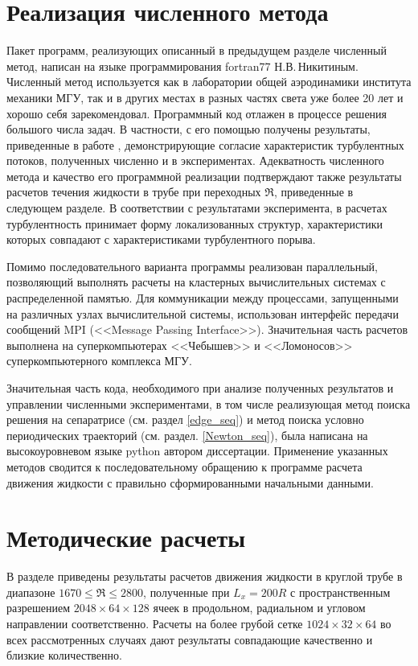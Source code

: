 \section{Реализация численного метода}

Пакет программ, реализующих описанный в предыдущем разделе численный метод, написан на языке программирования fortran77 Н.В.\,Никитиным. Численный метод используется как в лаборатории общей аэродинамики института механики МГУ, так и в других местах в разных частях света уже более 20 лет и хорошо себя зарекомендовал. Программный код отлажен в процессе решения большого числа задач. В частности, с его помощью получены результаты, приведенные в работе \cite{Nikitin2006}, демонстрирующие согласие характеристик турбулентных потоков, полученных численно и в экспериментах. Адекватность численного метода и качество его программной реализации подтверждают также результаты расчетов течения жидкости в трубе при переходных $\Re$, приведенные в следующем разделе. В соответствии с результатами эксперимента, в расчетах турбулентность принимает форму локализованных структур, характеристики которых совпадают с характеристиками турбулентного порыва.

Помимо последовательного варианта программы реализован параллельный, позволяющий выполнять расчеты на кластерных вычислительных системах с распределенной памятью. Для коммуникации между процессами, запущенными на различных узлах вычислительной системы, использован интерфейс передачи сообщений MPI (<<Message Passing Interface>>). Значительная часть расчетов выполнена на суперкомпьютерах <<Чебышев>> и <<Ломоносов>> суперкомпьютерного комплекса МГУ. 

Значительная часть кода, необходимого при анализе полученных результатов и управлении численными экспериментами, в том числе реализующая метод поиска решения на сепаратрисе (см. раздел \ref{edge_seq}) и метод поиска условно периодических траекторий (см. раздел. \ref{Newton_seq}), была написана на высокоуровневом языке python автором диссертации. Применение указанных методов сводится к последовательному обращению к программе расчета движения жидкости с правильно сформированными начальными данными. 


\section{Методические расчеты} \label{puff_calc}

В разделе приведены результаты расчетов движения жидкости в круглой трубе в диапазоне $1670 \leqslant \Re \leqslant 2800$, полученные при $L_x=200R$ с пространственным разрешением $2048 \times 64 \times 128$ ячеек в продольном, радиальном и угловом направлении соответственно. Расчеты на более грубой сетке $1024 \times 32 \times 64$ во всех рассмотренных случаях дают результаты совпадающие качественно и близкие количественно.

